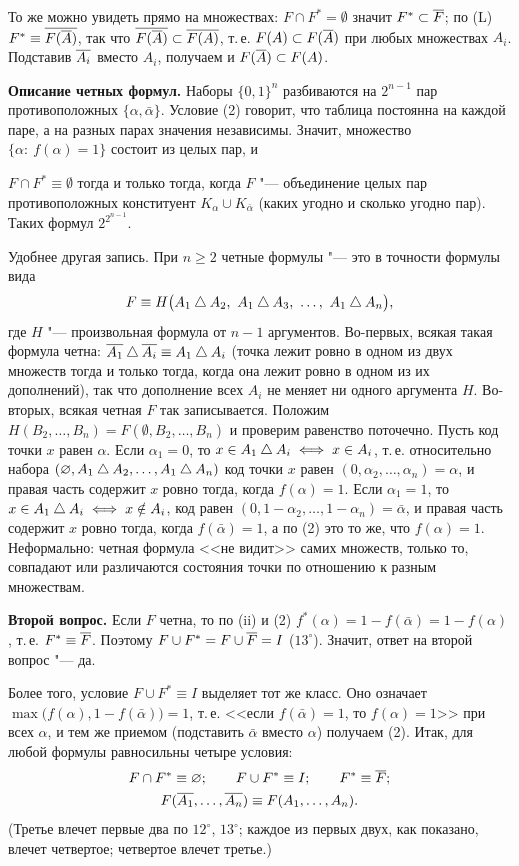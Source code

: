 \begin{solution}[3 (\S\,3)]
То же можно увидеть прямо на множествах: $F\cap F^*=\emptyset$ значит
$F^*\subset\overline{F}$; по (L) $F^*\equiv\overline{F(\overline{A})}$, так что
$\overline{F(\overline{A})}\subset\overline{F(A)}$, т.\,е. $F(A)\subset F(\overline{A})$ при любых
множествах $A_i$. Подставив $\overline{A_i}$ вместо $A_i$, получаем и
$F(\overline{A})\subset F(A)$.

\textbf{Описание четных формул.} Наборы $\{0,1\}^n$ разбиваются на $2^{n-1}$
пар противоположных $\{\alpha,\bar\alpha\}$. Условие (2) говорит, что таблица
постоянна на каждой паре, а на разных парах значения независимы. Значит,
множество $\{\alpha:\ f(\alpha)=1\}$ состоит из целых пар, и
\begin{keystmt}
$F\cap F^*\equiv\emptyset$ тогда и только тогда, когда $F$ "--- объединение
целых пар противоположных конституент $K_\alpha\cup K_{\bar\alpha}$
(каких угодно и сколько угодно пар). Таких формул $2^{2^{n-1}}$.
\end{keystmt}

Удобнее другая запись. При $n\ge2$ четные формулы "--- это в точности
формулы вида
\[
F\equiv H\bigl(A_1\sd A_2,\ A_1\sd A_3,\ \dots,\ A_1\sd A_n\bigr),
\]
где $H$ "--- произвольная формула от $n-1$ аргументов. Во-первых, всякая
такая формула четна: $\overline{A_1}\mathbin{\triangle}\overline{A_i}\equiv A_1\mathbin{\triangle} A_i$ (точка лежит
ровно в одном из двух множеств тогда и только тогда, когда она лежит ровно
в одном из их дополнений), так что дополнение всех $A_i$ не меняет ни
одного аргумента $H$. Во-вторых, всякая четная $F$ так записывается.
Положим $H(B_2,\dots,B_n)=F(\emptyset,B_2,\dots,B_n)$ и проверим равенство
поточечно. Пусть код точки $x$ равен $\alpha$. Если $\alpha_1=0$, то
$x\in A_1\mathbin{\triangle} A_i\iff x\in A_i$, т.\,е. относительно набора
$(\varnothing,A_1\mathbin{\triangle} A_2,\dots,A_1\mathbin{\triangle} A_n)$ код точки $x$ равен
$(0,\alpha_2,\dots,\alpha_n)=\alpha$, и правая часть содержит $x$ ровно
тогда, когда $f(\alpha)=1$. Если $\alpha_1=1$, то $x\in A_1\mathbin{\triangle} A_i\iff
x\notin A_i$, код равен $(0,1-\alpha_2,\dots,1-\alpha_n)=\bar\alpha$, и
правая часть содержит $x$ ровно тогда, когда $f(\bar\alpha)=1$, а по (2)
это то же, что $f(\alpha)=1$. Неформально: четная формула <<не видит>>
самих множеств, только то, совпадают или различаются состояния точки по
отношению к разным множествам.

\textbf{Второй вопрос.} Если $F$ четна, то по (ii) и (2)
$f^*(\alpha)=1-f(\bar\alpha)=1-f(\alpha)$, т.\,е. $F^*\equiv\overline{F}$. Поэтому
$F\cup F^*=F\cup\overline{F}=I$ ($13^\circ$). Значит, ответ на второй вопрос "---
да.

Более того, условие $F\cup F^*\equiv I$ выделяет тот же класс. Оно
означает $\max\bigl(f(\alpha),1-f(\bar\alpha)\bigr)=1$, т.\,е. <<если
$f(\bar\alpha)=1$, то $f(\alpha)=1$>> при всех $\alpha$, и тем же приемом
(подставить $\bar\alpha$ вместо $\alpha$) получаем (2). Итак, для любой
формулы равносильны четыре условия:
\begin{gather*}
F\cap F^*\equiv\varnothing;\qquad F\cup F^*\equiv I;\qquad F^*\equiv\overline{F};\\
F(\overline{A_1},\dots,\overline{A_n})\equiv F(A_1,\dots,A_n).
\end{gather*}
(Третье влечет первые два по $12^\circ$, $13^\circ$; каждое из первых двух,
как показано, влечет четвертое; четвертое влечет третье.)


\end{solution}
